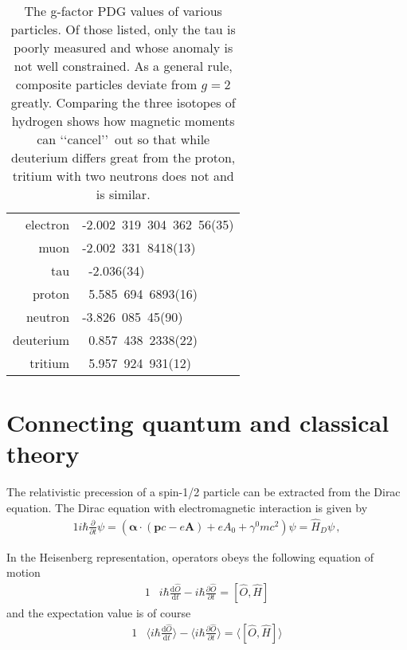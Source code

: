 \begin{table}
	\centering
\begin{tabular}{|r|l|}
	electron & -2.002\ 319\ 304\ 362\ 56(35)\\
	muon & -2.002\ 331\ 8418(13)\\
	tau & \ -2.036(34)\\
	proton & \ 5.585\ 694\ 6893(16)\\
	neutron & -3.826\ 085\ 45(90)\\
	deuterium & \ 0.857\ 438\ 2338(22)\\
	tritium & \ 5.957\ 924\ 931(12)
\end{tabular}
	\caption{The g-factor PDG values of various particles. Of those listed, only the tau is poorly measured and whose anomaly is not well constrained. As a general rule, composite particles deviate from $g=2$ greatly. Comparing the three isotopes of hydrogen shows how magnetic moments can \lq\lq cancel\rq\rq\ out so that while deuterium differs great from the proton, tritium with two neutrons does not and is similar.}
	\label{ajs:table:01}
\end{table}

\section{Connecting quantum and classical theory}
\label{sec:ehrenfest}
\noindent The relativistic precession of a spin-1/2 particle can be extracted from the Dirac equation. The Dirac equation with electromagnetic interaction is given by
\begin{alignat}{1}
  \label{DIRAC01} i\hbar\frac{\partial}{\partial t}\psi=\left(\boldsymbol{\alpha}\cdot\left(\mathbf{p}c-e\mathbf{A}\right)+eA_{0}+\gamma^{0}mc^{2}\right)\psi=\hat{H}_{D}\psi\,,
\end{alignat}

In the Heisenberg representation, operators obeys the following equation of motion
\begin{alignat}{1}
  \label{m06}		&i\hbar\frac{\mathrm{d}\hat{O}}{\mathrm{d}t}-i\hbar\frac{\partial\hat{O}}{\partial t}=[\hat{O},\hat{H}]
\end{alignat}
and the expectation value is of course
\begin{alignat}{1}
  \label{m07}		&\langle i\hbar\frac{\mathrm{d}\hat{O}}{\mathrm{d}t}\rangle-\langle i\hbar\frac{\partial\hat{O}}{\partial t}\rangle=\langle[\hat{O},\hat{H}]\rangle
\end{alignat}

